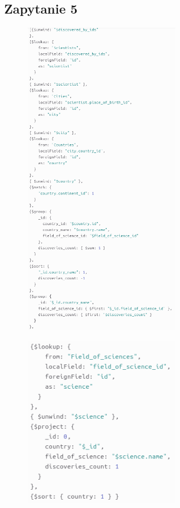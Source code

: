 \documentclass[11pt]{article}
\begin{document}
\newpage
	\subsection{Zapytanie 5}
		\begin{figure}[!ht]
			\begin{center}
				\includegraphics[width=250px]{m5_1.png}
			\end{center}
		\end{figure}
		
\newpage
		\begin{figure}[!ht]
			\begin{center}
				\includegraphics[width=250px]{m5_2.png}
			\end{center}
		\end{figure}
\end{document}
